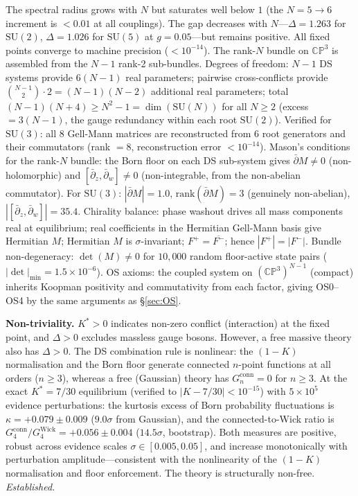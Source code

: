 \documentclass[11pt,a4paper]{article}
\theoremstyle{definition}
\theoremstyle{remark}
\newcommand{\CP}{\mathbb{CP}}
\newcommand{\dbar}{\bar{\partial}}
\newcommand{\SU}{\mathrm{SU}}
\begin{document}
The spectral radius grows with $N$ but saturates well below $1$ (the $N=5\to 6$ increment is $<0.01$ at all couplings). The gap decreases with $N$---$\Delta=1.263$ for $\SU(2)$, $\Delta=1.026$ for $\SU(5)$ at $g=0.05$---but remains positive. All fixed points converge to machine precision ($<10^{-14}$). The rank-$N$ bundle on $\CP^3$ is assembled from the $N-1$ rank-2 sub-bundles. Degrees of freedom: $N-1$ DS systems provide $6(N-1)$ real parameters; pairwise cross-conflicts provide $\binom{N-1}{2}\cdot 2=(N-1)(N-2)$ additional real parameters; total $(N-1)(N+4)\geq N^2-1=\dim(\SU(N))$ for all $N\geq 2$ (excess $=3(N-1)$, the gauge redundancy within each root $\SU(2)$). Verified for $\SU(3)$: all 8 Gell-Mann matrices are reconstructed from 6 root generators and their commutators (rank $=8$, reconstruction error $<10^{-14}$). Mason's conditions for the rank-$N$ bundle: the Born floor on each DS sub-system gives $\dbar M\neq 0$ (non-holomorphic) and $[\dbar_z,\dbar_w]\neq 0$ (non-integrable, from the non-abelian commutator). For $\SU(3)$: $|\dbar M|=1.0$, $\mathrm{rank}(\dbar M)=3$ (genuinely non-abelian), $|[\dbar_z,\dbar_w]|=35.4$. Chirality balance: phase washout drives all mass components real at equilibrium; real coefficients in the Hermitian Gell-Mann basis give Hermitian $M$; Hermitian $M$ is $\sigma$-invariant; $F^+=\overline{F^-}$; hence $|F^+|=|F^-|$. Bundle non-degeneracy: $\det(M)\neq 0$ for $10{,}000$ random floor-active state pairs ($|\det|_{\min}=1.5\times 10^{-6}$). OS axioms: the coupled system on $(\CP^3)^{N-1}$ (compact) inherits Koopman positivity and commutativity from each factor, giving OS0--OS4 by the same arguments as \S\ref{sec:OS}.

\textbf{Non-triviality.} $K^*>0$ indicates non-zero conflict (interaction) at the fixed point, and $\Delta>0$ excludes massless gauge bosons. However, a free massive theory also has $\Delta>0$. The DS combination rule is nonlinear: the $(1-K)$ normalisation and the Born floor generate connected $n$-point functions at all orders ($n\geq 3$), whereas a free (Gaussian) theory has $G_n^{\mathrm{conn}}=0$ for $n\geq 3$. At the exact $K^*=7/30$ equilibrium (verified to $|K-7/30|<10^{-15}$) with $5\times 10^5$ evidence perturbations: the kurtosis excess of Born probability fluctuations is $\kappa=+0.079\pm 0.009$ ($9.0\sigma$ from Gaussian), and the connected-to-Wick ratio is $G_4^{\mathrm{conn}}/G_4^{\mathrm{Wick}}=+0.056\pm 0.004$ ($14.5\sigma$, bootstrap). Both measures are positive, robust across evidence scales $\sigma\in[0.005,0.05]$, and increase monotonically with perturbation amplitude---consistent with the nonlinearity of the $(1-K)$ normalisation and floor enforcement. The theory is structurally non-free. \emph{Established.}
\end{document}
